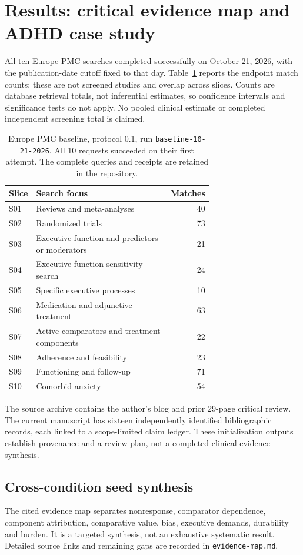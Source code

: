 \section{Results: critical evidence map and ADHD case study}
\label{sec:results}
All ten Europe PMC searches completed successfully on October 21, 2026, with the publication-date cutoff fixed to that day.
Table~\ref{tab:counts} reports the endpoint match counts; these are not screened studies and overlap across slices.
Counts are database retrieval totals, not inferential estimates, so confidence intervals and significance tests do not apply.
No pooled clinical estimate or completed independent screening total is claimed.

\begin{table}[htbp]
\centering
\small
\begin{tabular}{@{}lp{0.69\linewidth}r@{}}
\toprule
Slice & Search focus & Matches \\
\midrule
S01 & Reviews and meta-analyses & 40 \\
S02 & Randomized trials & 73 \\
S03 & Executive function and predictors or moderators & 21 \\
S04 & Executive function sensitivity search & 24 \\
S05 & Specific executive processes & 10 \\
S06 & Medication and adjunctive treatment & 63 \\
S07 & Active comparators and treatment components & 22 \\
S08 & Adherence and feasibility & 23 \\
S09 & Functioning and follow-up & 71 \\
S10 & Comorbid anxiety & 54 \\
\bottomrule
\end{tabular}
\caption{Europe PMC baseline, protocol 0.1, run \texttt{baseline-10-21-2026}.
All 10 requests succeeded on their first attempt.
The complete queries and receipts are retained in the repository.}
\label{tab:counts}
\end{table}

The source archive contains the author's blog and prior 29-page critical review.
The current manuscript has sixteen independently identified bibliographic records, each linked to a scope-limited claim ledger.
These initialization outputs establish provenance and a review plan, not a completed clinical evidence synthesis.

\subsection{Cross-condition seed synthesis}
The cited evidence map separates nonresponse, comparator dependence, component attribution, comparative value, bias, executive demands, durability and burden.
It is a targeted synthesis, not an exhaustive systematic result.
Detailed source links and remaining gaps are recorded in \texttt{evidence-map.md}.

